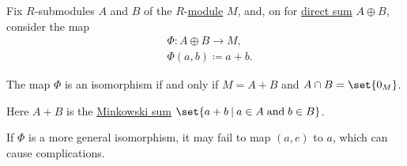 \begin{proposition}\label{thm:internal_binary_semimodule_direct_sum}
  Fix \( R \)-submodules \( A \) and \( B \) of the \( R \)-\hyperref[def:module]{module} \( M \), and, on for \hyperref[def:semimodule_direct_sum]{direct sum} \( A \oplus B \), consider the map
  \begin{equation*}
    \begin{aligned}
      &\Phi: A \oplus B \to M, \\
      &\Phi(a, b) \coloneqq a + b.
    \end{aligned}
  \end{equation*}

  The map \( \Phi \) is an isomorphism if and only if \( M = A + B \) and \( A \cap B = \set{ 0_M } \).
\end{proposition}
\begin{comments}
  \item Here \( A + B \) is the \hyperref[def:minkowski_sum]{Minkowski sum} \( \set{ a + b \given a \in A \T{and} b \in B } \).
  \item If \( \Phi \) is a more general isomorphism, it may fail to map \( (a, e) \) to \( a \), which can cause complications.
\end{comments}
